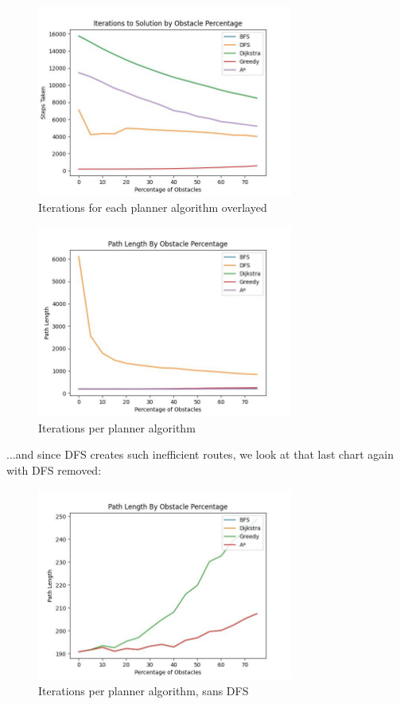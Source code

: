 \documentclass{article}
\begin{document}
\begin{figure}[H]
    \centering
    \includegraphics[width = 0.75\textwidth]{plots/steps_taken.jpg}
    \caption{Iterations for each planner algorithm overlayed}
    \label{fig:iterations-all}
\end{figure}

\begin{figure}[H]
    \centering
    \includegraphics[width = 0.75\textwidth]{plots/path_length.jpg}
    \caption{Iterations per planner algorithm}
    \label{fig:paths-all}
\end{figure}

...and since DFS creates such inefficient routes, we look at that last chart again with DFS removed:

\begin{figure}[H]
    \centering
    \includegraphics[width = 0.75\textwidth]{plots/path_length_sans_dfs.jpg}
    \caption{Iterations per planner algorithm, sans DFS}
    \label{fig:paths-sans-dfs}
\end{figure}
\end{document}
